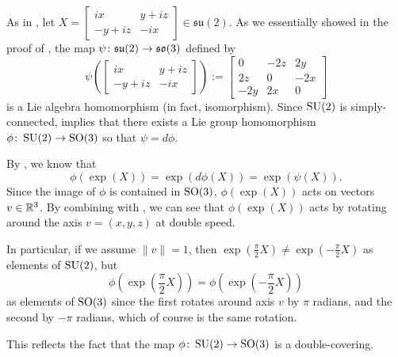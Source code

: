 \begin{example}\label{ex:su2 to so3}
	As in , let $X=\begin{bmatrix} ix & y + iz \\ -y+iz & -ix \end{bmatrix} \in \mathfrak{su}(2)$. As we essentially showed in the proof of , the map $\psi \colon\thinspace\! \mathfrak{su}(2) \to \mathfrak{so}(3)$ defined by
	\[
		\psi\left(\begin{bmatrix} ix & y + iz \\ -y+iz & -ix \end{bmatrix}\right) := \begin{bmatrix} 0 & -2z & 2y \\ 2z & 0 & -2x \\ -2y & 2x & 0\end{bmatrix}
	\]
	is a Lie algebra homomorphism (in fact, isomorphism). Since $\operatorname{SU}(2)$ is simply-connected,  implies that there exists a Lie group homomorphism $\phi \colon\thinspace\! \operatorname{SU}(2) \to \operatorname{SO}(3)$ so that $\psi = d\phi$.
	
	By , we know that
	\[
		\phi(\exp(X)) = \exp(d\phi(X)) = \exp(\psi(X)).
	\]
	Since the image of $\phi$ is contained in $\operatorname{SO}(3)$, $\phi(\exp(X))$ acts on vectors $v \in \mathbb{R}^3$. By combining with , we can see that $\phi(\exp(X))$ acts by rotating around the axis $v = (x,y,z)$ at double speed.
	
	In particular, if we assume $\|v\| =1$, then $\exp\left(\frac{\pi}{2} X \right)  \neq \exp\left(-\frac{\pi}{2} X \right)$ as elements of $\operatorname{SU}(2)$, but 
	\[
		\phi\left(\exp\left(\frac{\pi}{2} X \right)\right) = \phi\left(\exp\left(-\frac{\pi}{2} X \right)\right)
	\]
	as elements of $\operatorname{SO}(3)$ since the first rotates around axis $v$ by $\pi$ radians, and the second by $-\pi$ radians, which of course is the same rotation.
	
	This reflects the fact that the map $\phi\colon\thinspace\! \operatorname{SU}(2) \to \operatorname{SO}(3)$ is a double-covering.
\end{example}